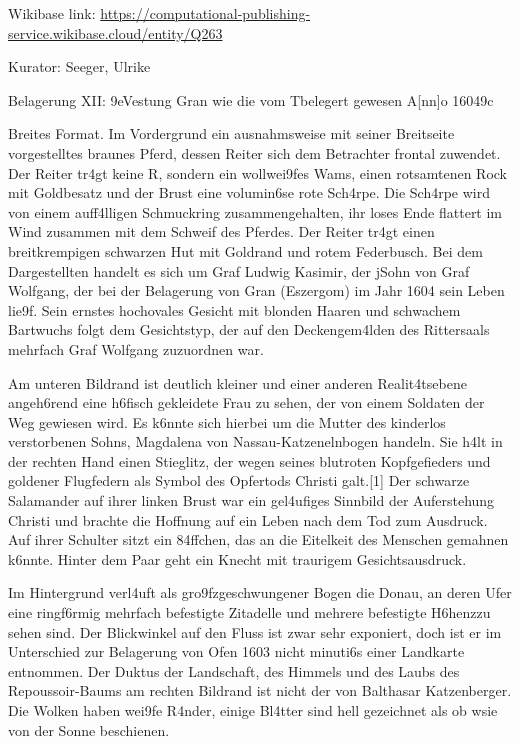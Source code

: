 \documentclass[
  letterpaper,
]{book}
\begin{document}
Wikibase link:
\url{https://computational-publishing-service.wikibase.cloud/entity/Q263}

Kurator: Seeger, Ulrike

Belagerung XII: \x9eVestung Gran wie die vom
T\xbcrcken belegert gewesen A{[}nn{]}o 1604\x9c

Breites Format. Im Vordergrund ein ausnahmsweise mit seiner Breitseite
vorgestelltes braunes Pferd, dessen Reiter sich dem Betrachter frontal
zuwendet. Der Reiter tr\xa4gt keine R\xbcstung, sondern ein
wollwei\x9fes Wams, einen rotsamtenen Rock mit Goldbesatz und
\xbcber der Brust eine volumin\xb6se rote Sch\xa4rpe. Die
Sch\xa4rpe wird von einem auff\xa4lligen Schmuckring
zusammengehalten, ihr loses Ende flattert im Wind zusammen mit dem
Schweif des Pferdes. Der Reiter tr\xa4gt einen breitkrempigen
schwarzen Hut mit Goldrand und rotem Federbusch. Bei dem Dargestellten
handelt es sich um Graf Ludwig Kasimir, der j\xbcngste Sohn von Graf
Wolfgang, der bei der Belagerung von Gran (Eszergom) im Jahr 1604 sein
Leben lie\x9f. Sein ernstes hochovales Gesicht mit blonden Haaren
und schwachem Bartwuchs folgt dem Gesichtstyp, der auf den
Deckengem\xa4lden des Rittersaals mehrfach Graf Wolfgang zuzuordnen
war.

Am unteren Bildrand ist deutlich kleiner und einer anderen
Realit\xa4tsebene angeh\xb6rend eine h\xb6fisch gekleidete
Frau zu sehen, der von einem Soldaten der Weg gewiesen wird. Es
k\xb6nnte sich hierbei um die Mutter des kinderlos verstorbenen
Sohns, Magdalena von Nassau-Katzenelnbogen handeln. Sie h\xa4lt in
der rechten Hand einen Stieglitz, der wegen seines blutroten
Kopfgefieders und goldener Flugfedern als Symbol des Opfertods Christi
galt.{[}1{]} Der schwarze Salamander auf ihrer linken Brust war ein
gel\xa4ufiges Sinnbild der Auferstehung Christi und brachte die
Hoffnung auf ein Leben nach dem Tod zum Ausdruck. Auf ihrer Schulter
sitzt ein \x84ffchen, das an die Eitelkeit des Menschen gemahnen
k\xb6nnte. Hinter dem Paar geht ein Knecht mit traurigem
Gesichtsausdruck.

Im Hintergrund verl\xa4uft als gro\x9fz\xbcgig geschwungener
Bogen die Donau, an deren Ufer eine ringf\xb6rmig mehrfach
befestigte Zitadelle und mehrere befestigte H\xb6henz\xbcge zu
sehen sind. Der Blickwinkel auf den Fluss ist zwar sehr exponiert, doch
ist er  im Unterschied zur Belagerung von Ofen 1603
 nicht minuti\xb6s einer Landkarte entnommen. Der Duktus
der Landschaft, des Himmels und des Laubs des Repoussoir-Baums am
rechten Bildrand ist nicht der von Balthasar Katzenberger. Die Wolken
haben wei\x9fe R\xa4nder, einige Bl\xa4tter sind hell
gezeichnet als ob w\xbcrden sie von der Sonne beschienen.
\end{document}
